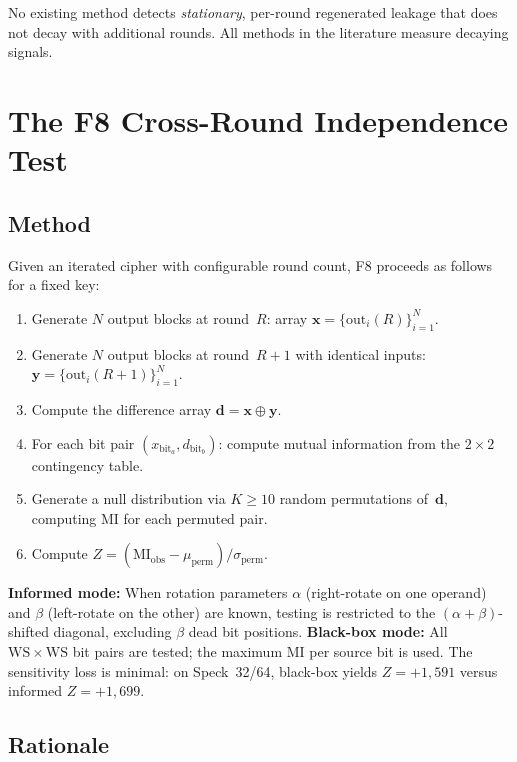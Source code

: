 \documentclass[conference,a4paper]{IEEEtran}
\begin{document}
No existing method detects \emph{stationary}, per-round regenerated leakage that does not decay with additional rounds. All methods in the literature measure decaying signals.

\section{The F8 Cross-Round Independence Test}

\subsection{Method}

Given an iterated cipher with configurable round count, F8 proceeds as follows for a fixed key:

\begin{enumerate}[nosep]
\item Generate $N$ output blocks at round~$R$: array $\mathbf{x} = \{\mathrm{out}_i(R)\}_{i=1}^N$.
\item Generate $N$ output blocks at round~$R{+}1$ with identical inputs: $\mathbf{y} = \{\mathrm{out}_i(R{+}1)\}_{i=1}^N$.
\item Compute the difference array $\mathbf{d} = \mathbf{x} \oplus \mathbf{y}$.
\item For each bit pair $(x_{\mathrm{bit}_a}, d_{\mathrm{bit}_b})$: compute mutual information from the $2 \times 2$ contingency table.
\item Generate a null distribution via $K \geq 10$ random permutations of~$\mathbf{d}$, computing MI for each permuted pair.
\item Compute $Z = (\mathrm{MI}_{\mathrm{obs}} - \mu_{\mathrm{perm}}) / \sigma_{\mathrm{perm}}$.
\end{enumerate}

\textbf{Informed mode:} When rotation parameters $\alpha$ (right-rotate on one operand) and $\beta$ (left-rotate on the other) are known, testing is restricted to the $(\alpha{+}\beta)$-shifted diagonal, excluding $\beta$ dead bit positions. \textbf{Black-box mode:} All $\mathrm{WS} \times \mathrm{WS}$ bit pairs are tested; the maximum MI per source bit is used. The sensitivity loss is minimal: on Speck~32/64, black-box yields $Z = +1{,}591$ versus informed $Z = +1{,}699$.

\subsection{Rationale}
\end{document}
